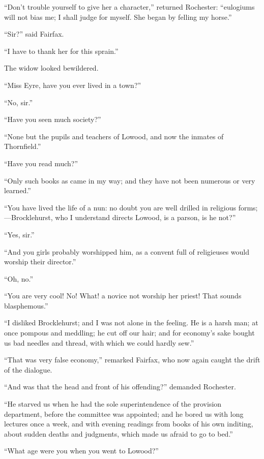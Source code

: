 \enquote{Don't trouble yourself to give her a character,} returned \Mr{}
 Rochester: \enquote{eulogiums will not bias me; I shall judge for
myself. She began by felling my horse.}

\enquote{Sir?} said \Mrs{} Fairfax.

\enquote{I have to thank her for this sprain.}

The widow looked bewildered.

\enquote{Miss Eyre, have you ever lived in a town?}

\enquote{No, sir.}

\enquote{Have you seen much society?}

\enquote{None but the pupils and teachers of Lowood, and now the inmates
of Thornfield.}

\enquote{Have you read much?}

\enquote{Only such books as came in my way; and they have not been
numerous or very learned.}

\enquote{You have lived the life of a nun: no doubt you are well drilled
in religious forms;---Brocklehurst, who I understand directs Lowood, is
a parson, is he not?}

\enquote{Yes, sir.}

\enquote{And you girls probably worshipped him, as a convent full of
religieuses would worship their director.}

\enquote{Oh, no.}

\enquote{You are very cool! No! What! a novice not worship her
priest! That sounds blasphemous.}

\enquote{I disliked \Mr{} Brocklehurst; and I was not alone in the
feeling. He is a harsh man; at once pompous and meddling; he cut off
our hair; and for economy's sake bought us bad needles and thread, with
which we could hardly sew.}

\enquote{That was very false economy,} remarked \Mrs{} Fairfax, who now
again caught the drift of the dialogue.

\enquote{And was that the head and front of his offending?} demanded \Mr{}
 Rochester.

\enquote{He starved us when he had the sole superintendence of the
provision department, before the committee was appointed; and he bored
us with long lectures once a week, and with evening readings from books
of his own inditing, about sudden deaths and judgments, which made us
afraid to go to bed.}

\enquote{What age were you when you went to Lowood?}

